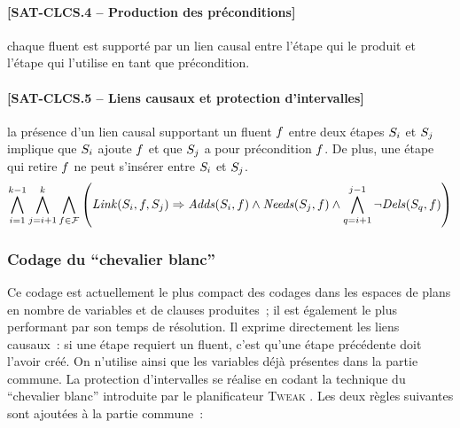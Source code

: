 {%
\paragraph*{[SAT-CLCS.4 -- Production des préconditions]} chaque fluent est supporté par un
  lien causal entre l'étape qui le produit et l'étape qui l'utilise en tant que
  précondition.
\paragraph*{[SAT-CLCS.5 -- Liens causaux et protection d'intervalles]} la présence d'un lien
  causal supportant un fluent $f$ entre deux étapes $S_{i}$ et $S_{j}$
  implique que $S_{i}$ ajoute $f$ et que $S_{j}$ a pour précondition
  $f$. De plus, une étape qui retire $f$ ne peut s'insérer entre $S_{i}$ et $S_{j}$.
\[
\BigforallTwo{i=1}{k-1} \BigforallTwo{j=i+1}{k} \Bigforall{\f\in \F} \left( %
  \Linksteps{i}{\f}{j} \Rightarrow \Adds{i}{\f} \land \Needs{j}{\f} \land %
  \BigforallTwo{q=i+1}{j-1} \lnot \Dels{q}{\f}%
  \right)
\]

\subsubsection{Codage du \enquote{chevalier blanc}}

Ce codage est actuellement le plus compact des codages dans les espaces de plans
en nombre de variables et de clauses produites~; il est également le plus
performant par son temps de résolution. Il exprime directement les liens
causaux~: si une étape requiert un fluent, c'est qu'une étape précédente doit
l'avoir créé. On n'utilise ainsi que les variables déjà présentes dans la partie
commune. La protection d'intervalles se réalise en codant la technique du
\enquote{chevalier blanc} introduite par le planificateur \textsc{Tweak}
\cite{Cha87}. Les deux règles suivantes sont ajoutées à la partie commune~:


}
